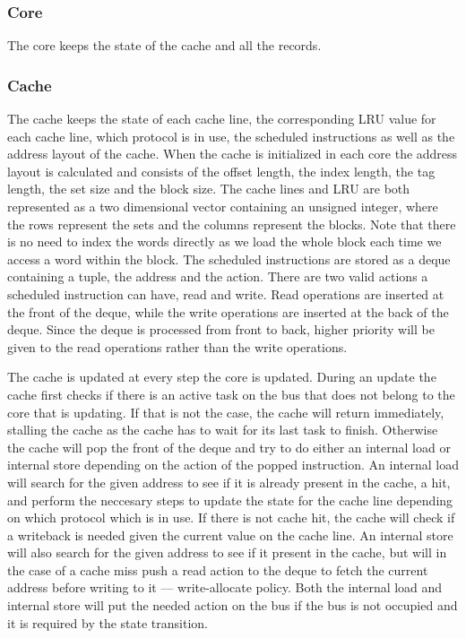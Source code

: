 \subsubsection{Core}
The core keeps the state of the cache and all the records.

\subsubsection{Cache}
The cache keeps the state of each cache line, the corresponding LRU value for each cache line, which protocol is in use, the scheduled instructions as well as the address layout of the cache.
When the cache is initialized in each core the address layout is calculated and consists of the offset length, the index length, the tag length, the set size and the block size.
The cache lines and LRU are both represented as a two dimensional vector containing an unsigned integer, where the rows represent the sets and the columns represent the blocks.
Note that there is no need to index the words directly as we load the whole block each time we access a word within the block.
The scheduled instructions are stored as a deque containing a tuple, the address and the action.
There are two valid actions a scheduled instruction can have, read and write.
Read operations are inserted at the front of the deque, while the write operations are inserted at the back of the deque.
Since the deque is processed from front to back, higher priority will be given to the read operations rather than the write operations.

The cache is updated at every step the core is updated.
During an update the cache first checks if there is an active task on the bus that does not belong to the core that is updating.
If that is not the case, the cache will return immediately, stalling the cache as the cache has to wait for its last task to finish.
Otherwise the cache will pop the front of the deque and try to do either an internal load or internal store depending on the action of the popped instruction.
An internal load will search for the given address to see if it is already present in the cache, a hit, and perform the neccesary steps to update the state for the cache line depending on which protocol which is in use.
If there is not cache hit, the cache will check if a writeback is needed given the current value on the cache line.
An internal store will also search for the given address to see if it present in the cache, but will in the case of a cache miss push a read action to the deque to fetch the current address before writing to it --- write-allocate policy.
Both the internal load and internal store will put the needed action on the bus if the bus is not occupied and it is required by the state transition.


